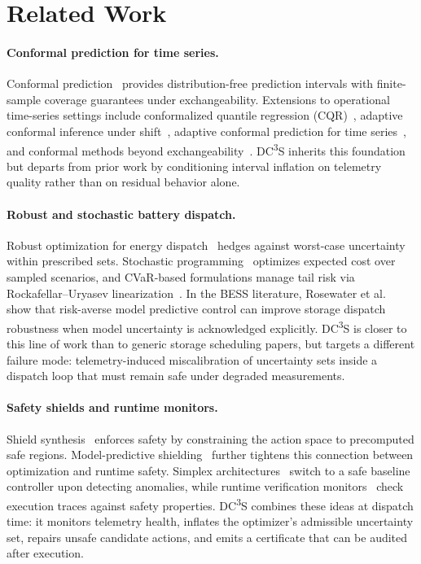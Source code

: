 \documentclass[11pt,a4paper,twocolumn]{article}
\begin{document}
\section{Related Work}\label{sec:related}

\paragraph{Conformal prediction for time series.}
Conformal prediction~\cite{vovk2005conformal,shafer2008tutorial} provides distribution-free prediction intervals with finite-sample coverage guarantees under exchangeability. Extensions to operational time-series settings include conformalized quantile regression (CQR)~\cite{romano2019conformalized}, adaptive conformal inference under shift~\cite{gibbs2021adaptive}, adaptive conformal prediction for time series~\cite{zaffran2022adaptive}, and conformal methods beyond exchangeability~\cite{barber2023conformal}. DC\textsuperscript{3}S inherits this foundation but departs from prior work by conditioning interval inflation on telemetry quality rather than on residual behavior alone.

\paragraph{Robust and stochastic battery dispatch.}
Robust optimization for energy dispatch~\cite{bertsimas2011theory,ben2009robust} hedges against worst-case uncertainty within prescribed sets. Stochastic programming~\cite{birge2011stochastic} optimizes expected cost over sampled scenarios, and CVaR-based formulations manage tail risk via Rockafellar--Uryasev linearization~\cite{rockafellar2000optimization}. In the BESS literature, Rosewater et al.~\cite{rosewater2020riskaverse} show that risk-averse model predictive control can improve storage dispatch robustness when model uncertainty is acknowledged explicitly. DC\textsuperscript{3}S is closer to this line of work than to generic storage scheduling papers, but targets a different failure mode: telemetry-induced miscalibration of uncertainty sets inside a dispatch loop that must remain safe under degraded measurements.

\paragraph{Safety shields and runtime monitors.}
Shield synthesis~\cite{alshiekh2018safe,konighofer2020shield} enforces safety by constraining the action space to precomputed safe regions. Model-predictive shielding~\cite{bastani2021safe} further tightens this connection between optimization and runtime safety. Simplex architectures~\cite{sha2001using} switch to a safe baseline controller upon detecting anomalies, while runtime verification monitors~\cite{leucker2009brief} check execution traces against safety properties. DC\textsuperscript{3}S combines these ideas at dispatch time: it monitors telemetry health, inflates the optimizer's admissible uncertainty set, repairs unsafe candidate actions, and emits a certificate that can be audited after execution.
\end{document}
